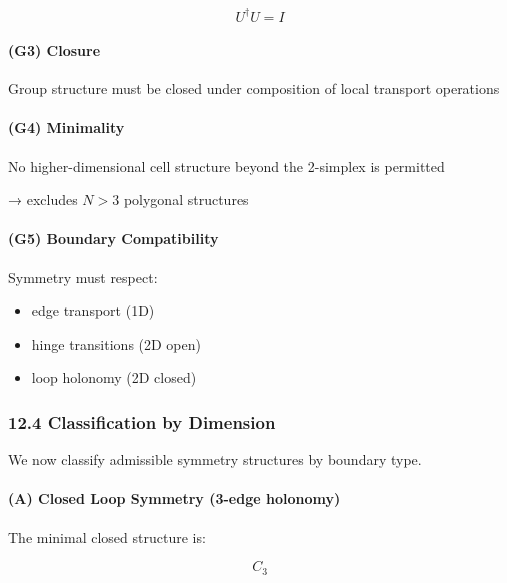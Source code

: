 \documentclass[
]{article}
\providecommand{\tightlist}{%
  \setlength{\itemsep}{0pt}\setlength{\parskip}{0pt}}
\begin{document}
\[
U^\dagger U = I
\]

\hypertarget{g3-closure}{%
\paragraph{(G3) Closure}\label{g3-closure}}

Group structure must be closed under composition of local transport
operations

\hypertarget{g4-minimality}{%
\paragraph{(G4) Minimality}\label{g4-minimality}}

No higher-dimensional cell structure beyond the 2-simplex is permitted

→ excludes \(N > 3\) polygonal structures

\hypertarget{g5-boundary-compatibility}{%
\paragraph{(G5) Boundary
Compatibility}\label{g5-boundary-compatibility}}

Symmetry must respect:

\begin{itemize}
\tightlist
\item
  edge transport (1D)
\item
  hinge transitions (2D open)
\item
  loop holonomy (2D closed)
\end{itemize}

\hypertarget{classification-by-dimension}{%
\subsubsection{12.4 Classification by
Dimension}\label{classification-by-dimension}}

We now classify admissible symmetry structures by boundary type.

\hypertarget{a-closed-loop-symmetry-3-edge-holonomy}{%
\paragraph{(A) Closed Loop Symmetry (3-edge
holonomy)}\label{a-closed-loop-symmetry-3-edge-holonomy}}

The minimal closed structure is:

\[
C_3
\]
\end{document}
